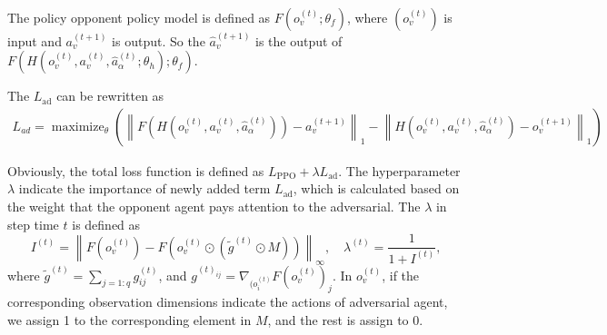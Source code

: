 \documentclass[a4paper]{article}
\begin{document}
The policy opponent policy model is defined as $F(o_v^{(t)}; \theta_f)$, where $(o_v^{(t)})$ is input and $a_v^{(t+1)}$ is output.
So the $\hat{a}_{v}^{(t+1)}$ is the output of $F(H(o_v^{(t)},a_v^{(t)},\hat{a}_\alpha^{(t)}; \theta_h);\theta_f)$. 

The $L_\text{ad}$ can be rewritten as
\begin{equation}
    \begin{aligned}
        L_{a d}= \operatorname{maximize}_{\theta}\left(\left\|F\left(H\left(o_{v}^{(t)}, a_{v}^{(t)}, \hat{a}_{\alpha}^{(t)}\right)\right)-a_{v}^{(t+1)}\right\|_{1}-\left\|H\left(o_{v}^{(t)}, a_{v}^{(t)}, \hat{a}_{\alpha}^{(t)}\right)-o_{v}^{(t+1)}\right\|_{1}\right)
    \end{aligned}    
\end{equation}

Obviously, the total loss function is defined as $L_\text{PPO} + \lambda L_\text{ad}$. The hyperparameter $\lambda$ indicate the importance of newly added term $L_\text{ad}$, 
which is calculated based on the weight that the opponent agent pays attention to the adversarial. 
The $\lambda$ in step time $t$ is defined as
\begin{equation}
    I^{(t)}=\left\|F\left(o_{v}^{(t)}\right)-F\left(o_{v}^{(t)} \odot\left(\tilde{g}^{(t)} \odot M\right)\right)\right\|_{\infty},\quad \lambda^{(t)}=\frac{1}{1+I^{(t)}},
\end{equation}
where $\tilde{g}^{(t)} = \sum_{j=1:q} g_{ij}^{(t)}$, and $g^{(t)_{ij}} = \nabla_{(o^{(t)}_i} F(o^{(t)}_v)_j$. 
In $o^{(t)}_v$, if the corresponding observation dimensions indicate the actions of adversarial agent, we assign 1 to the
corresponding element in $M$, and the rest is assign to 0.
\end{document}
